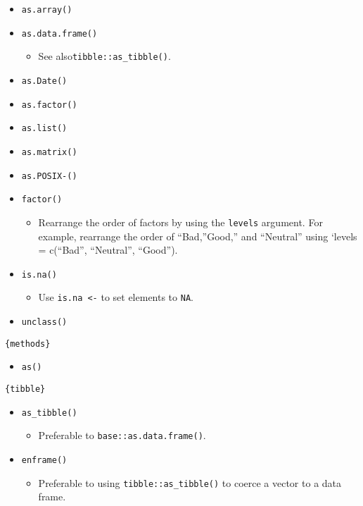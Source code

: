 \documentclass[
]{book}
\providecommand{\tightlist}{%
  \setlength{\itemsep}{0pt}\setlength{\parskip}{0pt}}
\begin{document}
\begin{itemize}
\tightlist
\item
  \texttt{as.array()}
\item
  \texttt{as.data.frame()}

  \begin{itemize}
  \tightlist
  \item
    See also\texttt{tibble::as\_tibble()}.
  \end{itemize}
\item
  \texttt{as.Date()}
\item
  \texttt{as.factor()}
\item
  \texttt{as.list()}
\item
  \texttt{as.matrix()}
\item
  \texttt{as.POSIX-()}
\item
  \texttt{factor()}

  \begin{itemize}
  \tightlist
  \item
    Rearrange the order of factors by using the \texttt{levels} argument. For example, rearrange the order of ``Bad,''Good,'' and ``Neutral'' using `levels = c(``Bad'', ``Neutral'', ``Good'').
  \end{itemize}
\item
  \texttt{is.na()}

  \begin{itemize}
  \tightlist
  \item
    Use \texttt{is.na\ \textless{}-} to set elements to \texttt{NA}.
  \end{itemize}
\item
  \texttt{unclass()}
\end{itemize}

\texttt{\{methods\}}

\begin{itemize}
\tightlist
\item
  \texttt{as()}
\end{itemize}

\texttt{\{tibble\}}

\begin{itemize}
\tightlist
\item
  \texttt{as\_tibble()}

  \begin{itemize}
  \tightlist
  \item
    Preferable to \texttt{base::as.data.frame()}.
  \end{itemize}
\item
  \texttt{enframe()}

  \begin{itemize}
  \tightlist
  \item
    Preferable to using \texttt{tibble::as\_tibble()} to coerce a vector to a data frame.
  \end{itemize}
\end{itemize}
\end{document}
